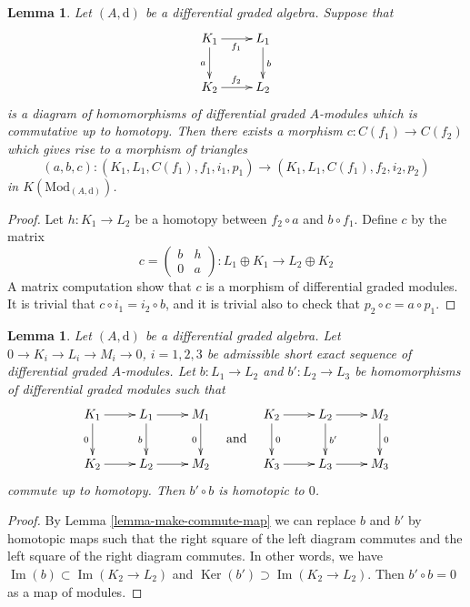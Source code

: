 \documentclass{stacks-project}
\theoremstyle{plain}
\newtheorem{lemma}[subsection]{Lemma}
\theoremstyle{definition}
\theoremstyle{remark}
\numberwithin{equation}{subsection}
\def\Ker{\mathop{\mathrm{Ker}}}
\def\Im{\mathop{\mathrm{Im}}}
\begin{document}
\begin{lemma}
\label{lemma-functorial-cone}
Let $(A, \text{d})$ be a differential graded algebra.
Suppose that
$$
\xymatrix{
K_1 \ar[r]_{f_1} \ar[d]_a & L_1 \ar[d]^b \\
K_2 \ar[r]^{f_2} & L_2
}
$$
is a diagram of homomorphisms of differential graded $A$-modules which is
commutative up to homotopy.
Then there exists a morphism $c : C(f_1) \to C(f_2)$ which gives rise to
a morphism of triangles
$$
(a, b, c) : (K_1, L_1, C(f_1), f_1, i_1, p_1) \to
(K_1, L_1, C(f_1), f_2, i_2, p_2)
$$
in $K(\text{Mod}_{(A, \text{d})})$.
\end{lemma}

\begin{proof}
Let $h : K_1 \to L_2$ be a homotopy between $f_2 \circ a$ and $b \circ f_1$.
Define $c$ by the matrix
$$
c =
\left(
\begin{matrix}
b & h \\
0 & a
\end{matrix}
\right) :
L_1 \oplus K_1 \to L_2 \oplus K_2
$$
A matrix computation show that $c$ is a morphism of differential
graded modules. It is trivial that $c \circ i_1 = i_2 \circ b$, and it is
trivial also to check that $p_2 \circ c = a \circ p_1$.
\end{proof}

\begin{lemma}
\label{lemma-nilpotent}
Let $(A, \text{d})$ be a differential graded algebra.
Let $0 \to K_i \to L_i \to M_i \to 0$, $i = 1, 2, 3$
be admissible short exact sequence of differential graded $A$-modules.
Let $b : L_1 \to L_2$ and $b' : L_2 \to L_3$
be homomorphisms of differential graded modules such that
$$
\vcenter{
\xymatrix{
K_1 \ar[d]_0 \ar[r] &
L_1 \ar[r] \ar[d]_b &
M_1 \ar[d]_0 \\
K_2 \ar[r] & L_2 \ar[r] & M_2
}
}
\quad\text{and}\quad
\vcenter{
\xymatrix{
K_2 \ar[d]^0 \ar[r] &
L_2 \ar[r] \ar[d]^{b'} &
M_2 \ar[d]^0 \\
K_3 \ar[r] & L_3 \ar[r] & M_3
}
}
$$
commute up to homotopy. Then $b' \circ b$ is homotopic to $0$.
\end{lemma}

\begin{proof}
By Lemma \ref{lemma-make-commute-map} we can replace $b$ and $b'$ by
homotopic maps such that the right square of the left diagram commutes
and the left square of the right diagram commutes. In other words, we have
$\Im(b) \subset \Im(K_2 \to L_2)$ and
$\Ker(b') \supset \Im(K_2 \to L_2)$.
Then $b' \circ b = 0$ as a map of modules.
\end{proof}
\end{document}

